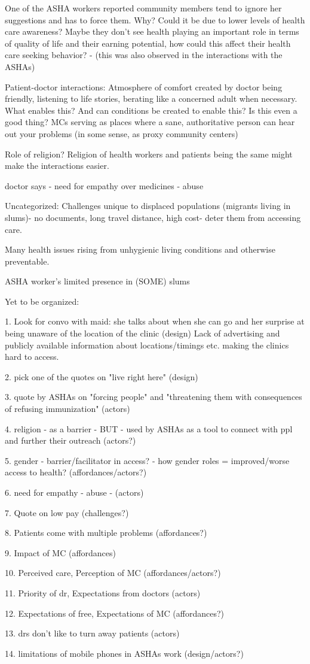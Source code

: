 One of the ASHA workers reported community members tend to ignore her suggestions and has to force them. Why? Could it be due to lower levels of health care awareness? Maybe they don't see health playing an important role in terms of quality of life and their earning potential, how could this affect their health care seeking behavior? - (this was also observed in the interactions with the ASHAs)

Patient-doctor interactions: Atmosphere of comfort created by doctor being friendly, listening to life stories, berating like a concerned adult when necessary. What enables this? And can conditions be created to enable this? Is this even a good thing? MCs serving as places where a sane, authoritative person can hear out your problems (in some sense, as proxy community centers)

Role of religion? Religion of health workers and patients being the same might make the interactions easier. 

doctor says - need for empathy over medicines - abuse

Uncategorized:
Challenges unique to displaced populations (migrants living in slums)- no documents, long travel distance, high cost- deter them from accessing care. 

Many health issues rising from unhygienic living conditions and otherwise preventable.

ASHA worker's limited presence in (SOME) slums

Yet to be organized:

1. Look for convo with maid: she talks about when she can go and her surprise at being unaware of the location of the clinic (design)
Lack of advertising and publicly available information about locations/timings etc.  making the clinics hard to access.

2. pick one of the quotes on "live right here" (design)

3. quote by ASHAs on "forcing people" and "threatening them with consequences of refusing immunization" (actors)

4. religion - as a barrier - BUT - used by ASHAs as a tool to connect with ppl and further their outreach (actors?)

5. gender - barrier/facilitator in access? - how gender roles = improved/worse access to health? (affordances/actors?)

6. need for empathy - abuse - (actors) 

7. Quote on low pay (challenges?)

8. Patients come with multiple problems (affordances?)

9. Impact of MC (affordances)

10. Perceived care, Perception of MC (affordances/actors?)

11. Priority of dr, Expectations from doctors (actors)

12. Expectations of free, Expectations of MC (affordances?)

13. drs don't like to turn away patients (actors)

14. limitations of mobile phones in ASHAs work (design/actors?)